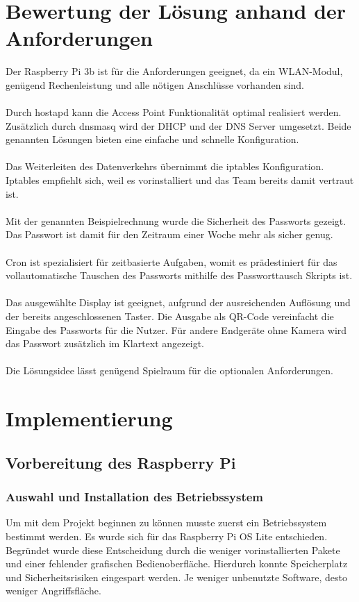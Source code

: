 \documentclass[a4paper,11pt,singlespacing]{article}
\begin{document}
		
	\section{Bewertung der Lösung anhand der Anforderungen}
    	Der Raspberry Pi 3b ist für die Anforderungen geeignet, da ein WLAN-Modul, genügend Rechenleistung und alle nötigen Anschlüsse vorhanden sind. \\ \\
    	Durch hostapd kann die Access Point Funktionalität optimal realisiert werden. Zusätzlich durch dnsmasq wird der DHCP und der DNS Server umgesetzt. Beide genannten Lösungen bieten eine einfache und schnelle Konfiguration. \\ \\
    	Das Weiterleiten des Datenverkehrs übernimmt die iptables Konfiguration. Iptables empfiehlt sich, weil es vorinstalliert und das Team bereits damit vertraut ist. \\ \\
    	Mit der genannten Beispielrechnung wurde die Sicherheit des Passworts gezeigt. Das Passwort ist damit für den Zeitraum einer Woche mehr als sicher genug. \\ \\
    	Cron ist spezialisiert für zeitbasierte Aufgaben, womit es prädestiniert für das vollautomatische Tauschen des Passworts mithilfe des Passworttausch Skripts ist. \\ \\
    	Das ausgewählte Display ist geeignet, aufgrund der ausreichenden Auflösung und der bereits angeschlossenen Taster. Die Ausgabe als QR-Code vereinfacht die Eingabe des Passworts für die Nutzer. Für andere Endgeräte ohne Kamera wird das Passwort zusätzlich im Klartext angezeigt. \\ \\
    	Die Lösungsidee lässt genügend Spielraum für die optionalen Anforderungen.
    	
    \section{Implementierung}
    	\subsection{Vorbereitung des Raspberry Pi}
    	\subsubsection{Auswahl und Installation des Betriebssystem}
    	    Um mit dem Projekt beginnen zu können musste zuerst ein Betriebssystem bestimmt werden.
        	Es wurde sich für das Raspberry Pi OS Lite entschieden. Begründet wurde diese Entscheidung  durch die weniger vorinstallierten Pakete und einer fehlender grafischen Bedienoberfläche. Hierdurch konnte Speicherplatz und Sicherheitsrisiken eingespart werden. Je weniger unbenutzte Software, desto weniger Angriffsfläche. \\ 
    	
\end{document}
